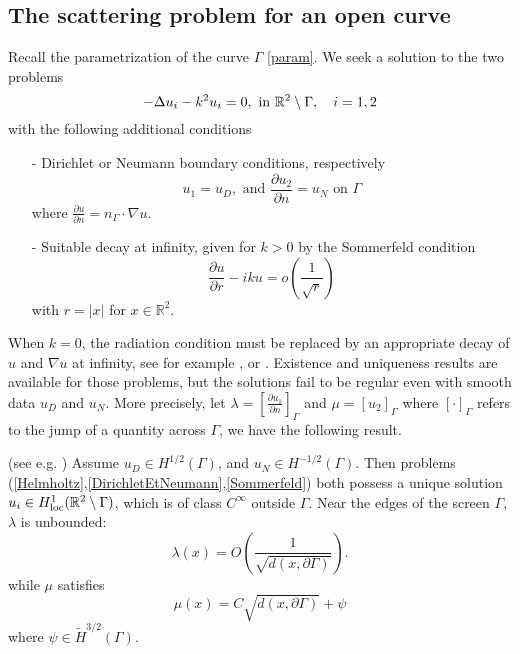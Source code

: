 \documentclass[a4paper]{article}
\begin{document}
\subsection{The scattering problem for an open curve}

\label{sec:scattering}
Recall the parametrization of the curve $\Gamma$ \autoref{param}.
We seek a solution to the two problems
\begin{equation}
-\Delta u_i - k^2 u_i = 0,  \text{ in } \mathbb{R}^2 \setminus \Gamma, \quad i = 1,2
\label{Helmholtz}
\end{equation}
with the following additional conditions
\begin{itemize}
	\item[-] Dirichlet or Neumann boundary conditions, respectively
	\begin{equation}
	u_1 = u_D, \text{ and  } \dfrac{\partial u_2}{\partial n} = u_N \text{ on } \Gamma
	\label{DirichletEtNeumann}
	\end{equation}
	where $\frac{\partial u}{\partial n} = n_\Gamma \cdot \nabla u$.
	\item[-] Suitable decay at infinity, given for $k > 0$ by the Sommerfeld condition
	\begin{equation}
	\dfrac{\partial u}{\partial r} - iku = o\left(\frac{1}{\sqrt{r}}\right)
	\label{Sommerfeld}
	\end{equation}
	with $r=|x|$ for $x\in \mathbb{R}^2$.
\end{itemize}
When $k=0$, the radiation condition must be replaced by an appropriate decay of $u$ and $\nabla u$ at infinity, see for example \cite{wendland1990hypersingular,stephan1984augmented}, or \cite[Chap. 7]{mclean2000strongly} . 
Existence and uniqueness results are available for those problems, but the solutions fail to be regular even with smooth data $u_D$ and $u_N$. More precisely,  let $\lambda = \left[\frac{\partial u_1}{\partial n}\right]_\Gamma$ and $\mu = \left[u_2\right]_\Gamma$ where $ \left[\cdot \right]_\Gamma$ refers to the jump of a quantity across $\Gamma$, we have the following result.
\begin{The}
	(see e.g. \cite{stephan1984augmented,wendland1990hypersingular,monch1996numerical}) Assume $u_D \in H^{1/2}(\Gamma)$, and $u_N \in H^{-1/2}(\Gamma)$. Then problems (\ref{Helmholtz},\ref{DirichletEtNeumann},\ref{Sommerfeld}) both possess a unique solution $u_i \in H^1_\textup{loc}(\mathbb{R}^2 \setminus \Gamma)$, which is of class $C^{\infty}$ outside $\Gamma$. Near the edges of the screen $\Gamma$, $\lambda$ is unbounded:
	\[\lambda(x)  = O\left(\frac{1}{\sqrt{d(x,\partial \Gamma)}}\right).\]
	while $\mu$ satisfies
	\[\mu(x) = C\sqrt{d(x,\partial \Gamma)} + \psi\]
	where $\psi \in \tilde{H}^{3/2}(\Gamma)$.
	\label{theScatt}
\end{The}
\end{document}
